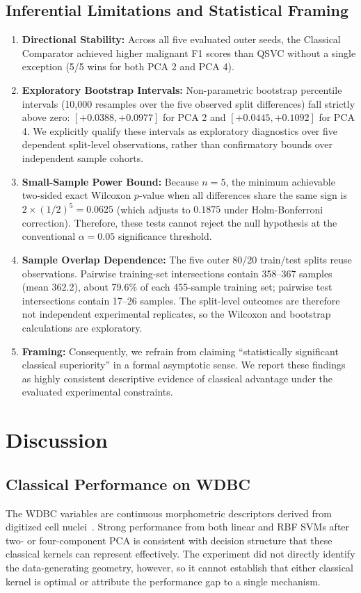 \documentclass[12pt,a4paper]{article}
\begin{document}
\subsection{Inferential Limitations and Statistical Framing}
\begin{enumerate}
    \item \textbf{Directional Stability:} Across all five evaluated outer seeds, the Classical Comparator achieved higher malignant F1 scores than QSVC without a single exception (5/5 wins for both PCA 2 and PCA 4).
    \item \textbf{Exploratory Bootstrap Intervals:} Non-parametric bootstrap percentile intervals (10,000 resamples over the five observed split differences) fall strictly above zero: $[+0.0388, +0.0977]$ for PCA 2 and $[+0.0445, +0.1092]$ for PCA 4. We explicitly qualify these intervals as exploratory diagnostics over five dependent split-level observations, rather than confirmatory bounds over independent sample cohorts.
    \item \textbf{Small-Sample Power Bound:} Because $n=5$, the minimum achievable two-sided exact Wilcoxon $p$-value when all differences share the same sign is $2 \times (1/2)^5 = 0.0625$ (which adjusts to $0.1875$ under Holm-Bonferroni correction). Therefore, these tests cannot reject the null hypothesis at the conventional $\alpha = 0.05$ significance threshold.
    \item \textbf{Sample Overlap Dependence:} The five outer 80/20 train/test splits reuse observations. Pairwise training-set intersections contain 358--367 samples (mean 362.2), about 79.6\% of each 455-sample training set; pairwise test intersections contain 17--26 samples. The split-level outcomes are therefore not independent experimental replicates, so the Wilcoxon and bootstrap calculations are exploratory.
    \item \textbf{Framing:} Consequently, we refrain from claiming ``statistically significant classical superiority'' in a formal asymptotic sense. We report these findings as highly consistent descriptive evidence of classical advantage under the evaluated experimental constraints.
\end{enumerate}

\section{Discussion}

\subsection{Classical Performance on WDBC}
The WDBC variables are continuous morphometric descriptors derived from digitized cell nuclei~\cite{street1993nuclear}. Strong performance from both linear and RBF SVMs after two- or four-component PCA is consistent with decision structure that these classical kernels can represent effectively. The experiment did not directly identify the data-generating geometry, however, so it cannot establish that either classical kernel is optimal or attribute the performance gap to a single mechanism.
\end{document}
